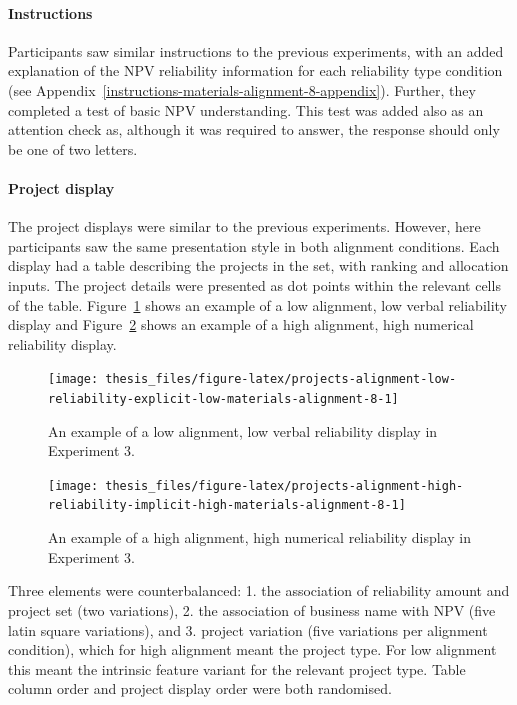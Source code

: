 \documentclass[a4paper, nobind, dvipsnames]{templates/ociamthesis}
\theoremstyle{definition}
\theoremstyle{definition}
\theoremstyle{definition}
\theoremstyle{definition}
\theoremstyle{remark}
\begin{document}
\paragraph{Instructions}

Participants saw similar instructions to the previous experiments, with an added
explanation of the NPV reliability information for each reliability type
condition (see Appendix~\ref{instructions-materials-alignment-8-appendix}). Further, they
completed a test of basic NPV understanding. This test was added also as an
attention check as, although it was required to answer, the response should only
be one of two letters.

\paragraph{Project display}

The project displays were similar to the previous experiments. However, here
participants saw the same presentation style in both alignment conditions. Each
display had a table describing the projects in the set, with ranking and
allocation inputs. The project details were presented as dot points within the
relevant cells of the table.
Figure~\ref{fig:projects-alignment-low-reliability-explicit-low-materials-alignment-8}
shows an example of a low alignment, low verbal reliability display and
Figure~\ref{fig:projects-alignment-high-reliability-implicit-high-materials-alignment-8}
shows an example of a high alignment, high numerical reliability display.



\begin{figure}
\texttt{[image: thesis\_files/figure-latex/projects-alignment-low-reliability-explicit-low-materials-alignment-8-1]} \caption{An example of a low alignment, low verbal reliability display in Experiment 3.}\label{fig:projects-alignment-low-reliability-explicit-low-materials-alignment-8}
\end{figure}



\begin{figure}
\texttt{[image: thesis\_files/figure-latex/projects-alignment-high-reliability-implicit-high-materials-alignment-8-1]} \caption{An example of a high alignment, high numerical reliability display in Experiment 3.}\label{fig:projects-alignment-high-reliability-implicit-high-materials-alignment-8}
\end{figure}

Three elements were counterbalanced: 1. the association of reliability amount
and project set (two variations), 2. the association of business name with NPV
(five latin square variations), and 3. project variation (five variations per
alignment condition), which for high alignment meant the project type. For low
alignment this meant the intrinsic feature variant for the relevant project
type. Table column order and project display order were both randomised.
\end{document}
